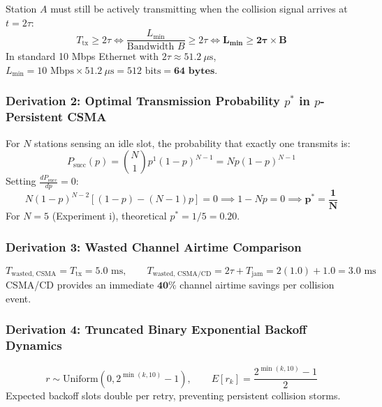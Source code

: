 \documentclass[11pt,a4paper]{article}
\begin{document}
Station $A$ must still be actively transmitting when the collision signal arrives at $t = 2\tau$:
\begin{equation}
    T_{\text{tx}} \ge 2\tau \iff \frac{L_{\min}}{\text{Bandwidth } B} \ge 2\tau \iff \mathbf{L_{\min} \ge 2\tau \times B}
\end{equation}
In standard 10 Mbps Ethernet with $2\tau \approx 51.2\ \mu\text{s}$, $L_{\min} = 10\text{ Mbps} \times 51.2\ \mu\text{s} = 512\text{ bits} = \mathbf{64\text{ bytes}}$.

\subsubsection{Derivation 2: Optimal Transmission Probability $p^*$ in $p$-Persistent CSMA}
For $N$ stations sensing an idle slot, the probability that exactly one transmits is:
\begin{equation}
    P_{\text{succ}}(p) = \binom{N}{1} p^1 (1 - p)^{N - 1} = N p (1 - p)^{N - 1}
\end{equation}
Setting $\frac{d P_{\text{succ}}}{dp} = 0$:
\begin{equation}
    N (1 - p)^{N - 2} \left[ (1 - p) - (N - 1)p \right] = 0 \implies 1 - N p = 0 \implies \mathbf{p^* = \frac{1}{N}}
\end{equation}
For $N = 5$ (Experiment i), theoretical $p^* = 1/5 = \mathbf{0.20}$.

\subsubsection{Derivation 3: Wasted Channel Airtime Comparison}
\begin{equation}
    T_{\text{wasted, CSMA}} = T_{\text{tx}} = 5.0\text{ ms}, \qquad T_{\text{wasted, CSMA/CD}} = 2\tau + T_{\text{jam}} = 2(1.0) + 1.0 = 3.0\text{ ms}
\end{equation}
CSMA/CD provides an immediate $\mathbf{40\%}$ channel airtime savings per collision event.

\subsubsection{Derivation 4: Truncated Binary Exponential Backoff Dynamics}
\begin{equation}
    r \sim \text{Uniform}(0, 2^{\min(k, 10)} - 1), \qquad E[r_k] = \frac{2^{\min(k, 10)} - 1}{2}
\end{equation}
Expected backoff slots double per retry, preventing persistent collision storms.
\end{document}
